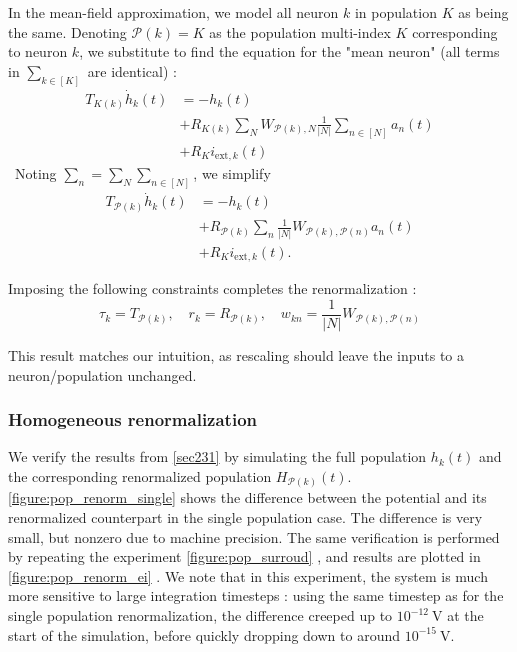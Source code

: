 \documentclass[10pt,conference,compsocconf,a4paper]{IEEEtran}
\newcommand{\nunit}[1]{\ \si{#1}}
\newcommand*{\shortautoref}[1]{%
	\begingroup
	\def\equationautorefname{\textsc{Eq.}}%
	\def\tableautorefname{\textsc{Tab.}}%
	\def\figureautorefname{\textsc{Fig.}}%
	\autoref{#1}%
	\endgroup
}
\begin{document}
			In the mean-field approximation, we model all neuron $k$ in population $K$ as being the same. Denoting $\mathcal P(k) = K$ as the population multi-index $K$ corresponding to neuron $k$, we substitute to find the equation for the "mean neuron" (all terms in $\sum_{k \in [K]}$ are identical) :
\
			\begin{equation*}
				\begin{aligned}
					T_{K(k)} \dot h_k(t) &= - h_k(t) \\ &+ R_{K(k)} \sum_N W_{\mathcal P(k),N} \frac{1}{|N|} \sum_{n \in [N]} a_n(t) \\ &+ R_K i_{\text{ext},k}(t)
				\end{aligned}
			\end{equation*}
\
			Noting $\sum_n = \sum_N \sum_{n \in [N]}$, we simplify
\
			\begin{equation*}
				\begin{aligned}
					T_{\mathcal P(k)} \dot h_k(t) &= - h_k(t) \\ &+ R_{\mathcal P(k)} \sum_n \frac{1}{|N|} W_{\mathcal P(k),\mathcal P(n)} a_n(t) \\ &+ R_K i_{\text{ext},k}(t).
				\end{aligned}
			\end{equation*}

			Imposing the following constraints completes the renormalization :
\
			\begin{equation*}
				\tau_k = T_{\mathcal P(k)}, \quad r_k = R_{\mathcal P(k)}, \quad w_{kn} = \frac{1}{|N|} W_{\mathcal P(k),\mathcal P(n)}
			\end{equation*}

			This result matches our intuition, as rescaling should leave the inputs to a neuron/population unchanged.

		\subsubsection{Homogeneous renormalization}

			We verify the results from \shortautoref{sec231} by simulating the full population $h_k(t)$ and the corresponding renormalized population $H_{\mathcal P(k)}(t)$. \shortautoref{figure:pop_renorm_single} shows the difference between the potential and its renormalized counterpart in the single population case. The difference is very small, but nonzero due to machine precision. The same verification is performed by repeating the experiment \shortautoref{figure:pop_surroud}, and results are plotted in \shortautoref{figure:pop_renorm_ei}. We note that in this experiment, the system is much more sensitive to large integration timesteps : using the same timestep as for the single population renormalization, the difference creeped up to $10^{-12} \nunit{\volt}$ at the start of the simulation, before quickly dropping down to around $10^{-15} \nunit{\volt}$.
\end{document}
